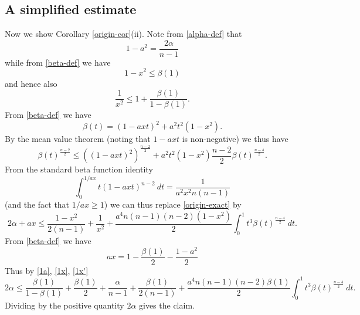 \documentclass[12pt]{article}
\begin{document}
\subsection{A simplified estimate}

Now we show Corollary \ref{origin-cor}(ii).
Note from \eqref{alpha-def} that
\begin{equation}\label{1a}
 1-a^2 = \frac{2\alpha}{n-1}
\end{equation}
while from \eqref{beta-def} we have
\begin{equation}\label{1x}
 1 - x^2 \leq \beta(1) 
\end{equation}
and hence also
\begin{equation}\label{1x'}
\frac{1}{x^2} \leq 1 + \frac{\beta(1)}{1-\beta(1)}.
\end{equation}
From \eqref{beta-def} we have
$$ \beta(t) = (1 - axt)^2 + a^2 t^2 (1-x^2).$$
By the mean value theorem (noting that $1-axt$ is non-negative) we thus have
$$ \beta(t)^{\frac{n-2}{2}} \leq ((1 - axt)^2)^{\frac{n-2}{2}}
+ a^2 t^2 (1-x^2) \frac{n-2}{2} \beta(t)^{\frac{n-4}{2}}.$$
From the standard beta function identity
$$ \int_0^{1/ax} t (1 - axt)^{n-2}\ dt = \frac{1}{a^2 x^2 n(n-1)}$$
(and the fact that $1/ax \geq 1$) we can thus replace \eqref{origin-exact} by
$$ 2\alpha + ax \leq \frac{1-x^2}{2(n-1)} + \frac{1}{x^2}
+ \frac{a^4 n (n-1) (n-2) (1-x^2)}{2} \int_0^1 t^3 \beta(t)^{\frac{n-4}{2}}\ dt.$$
From \eqref{beta-def} we have
$$ax = 1 - \frac{\beta(1)}{2} - \frac{1-a^2}{2}$$
Thus by \eqref{1a}, \eqref{1x}, \eqref{1x'} 
$$ 2\alpha \leq \frac{\beta(1)}{1-\beta(1)} + \frac{\beta(1)}{2} + \frac{\alpha}{n-1} + \frac{\beta(1)}{2(n-1)}  
+ \frac{a^4 n (n-1) (n-2) \beta(1)}{2} \int_0^1 t^3 \beta(t)^{\frac{n-4}{2}}\ dt.$$
Dividing by the positive quantity $2\alpha$ gives the claim.
\end{document}
